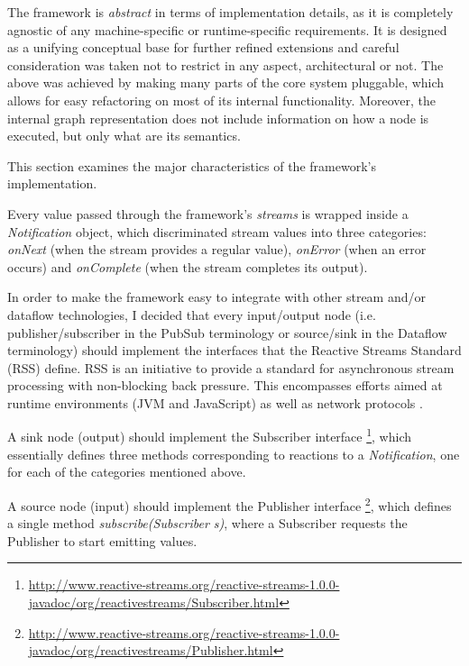 \documentclass{dithesis}
\begin{document}

The framework is \textit{abstract} in terms of implementation details, as it is completely agnostic of any machine-specific or runtime-specific requirements. It is designed as a unifying conceptual base for further refined extensions and careful consideration was taken not to restrict in any aspect, architectural or not. The above was achieved by making many parts of the core system pluggable, which allows for easy refactoring on most of its internal functionality. Moreover, the internal graph representation does not include information on how a node is executed, but only what are its semantics.

This section examines the major characteristics of the framework's implementation.

Every value passed through the framework's \textit{streams} is wrapped inside a \textit{Notification} object, which discriminated stream values into three categories: \textit{onNext} (when the stream provides a regular value), \textit{onError} (when an error occurs) and \textit{onComplete} (when the stream completes its output).

In order to make the framework easy to integrate with other stream and/or dataflow technologies, I decided that every input/output node (i.e. publisher/subscriber in the PubSub terminology or source/sink in the Dataflow terminology) should implement the interfaces that the Reactive Streams Standard (RSS) define. RSS is an initiative to provide a standard for asynchronous stream processing with non-blocking back pressure. This encompasses efforts aimed at runtime environments (JVM and JavaScript) as well as network protocols \cite{rss}.

A sink node (output) should implement the Subscriber interface \footnote{\url{http://www.reactive-streams.org/reactive-streams-1.0.0-javadoc/org/reactivestreams/Subscriber.html}}, which essentially defines three methods corresponding to reactions to a \textit{Notification}, one for each of the categories mentioned above. 

A source node (input) should implement the Publisher interface \footnote{\url{http://www.reactive-streams.org/reactive-streams-1.0.0-javadoc/org/reactivestreams/Publisher.html}}, which defines a single method \textit{subscribe(Subscriber s)}, where a Subscriber requests the Publisher to start emitting values. 
\end{document}
